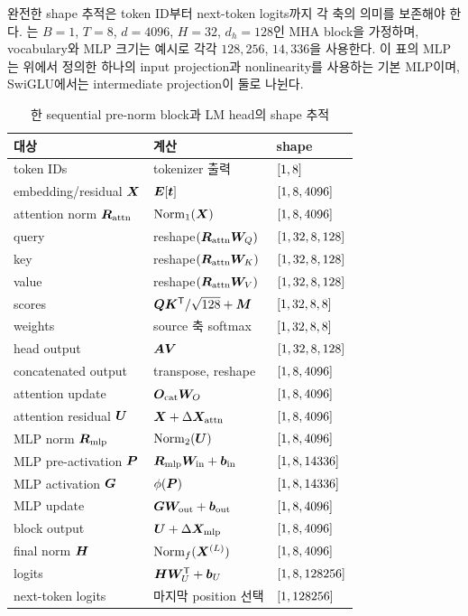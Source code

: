 완전한 shape 추적은 token ID부터 next-token logits까지 각 축의 의미를 보존해야 한다.
는 $B=1$, $T=8$, $d=4096$, $H=32$, $d_h=128$인 MHA block을 가정하며, vocabulary와 MLP 크기는 예시로 각각 $128{,}256$, $14{,}336$을 사용한다.
이 표의 MLP는 위에서 정의한 하나의 input projection과 nonlinearity를 사용하는 기본 MLP이며, SwiGLU에서는 intermediate projection이 둘로 나뉜다.

\begin{table}[htbp]
\centering
\small
\caption{한 sequential pre-norm block과 LM head의 shape 추적}
\label{tab:shape-trace}
\begin{tabularx}{\textwidth}{@{}YYl@{}}
\toprule
대상 & 계산 & shape \\
\midrule
token IDs & tokenizer 출력 & $\left[1,8\right]$ \\
embedding/residual $\bm{X}$ & $\bm{E}[\bm{t}]$ & $\left[1,8,4096\right]$ \\
attention norm $\bm{R}_{\mathrm{attn}}$ & $\operatorname{Norm}_{1}(\bm{X})$ & $\left[1,8,4096\right]$ \\
query & reshape$(\bm{R}_{\mathrm{attn}}\bm{W}_Q)$ & $\left[1,32,8,128\right]$ \\
key & reshape$(\bm{R}_{\mathrm{attn}}\bm{W}_K)$ & $\left[1,32,8,128\right]$ \\
value & reshape$(\bm{R}_{\mathrm{attn}}\bm{W}_V)$ & $\left[1,32,8,128\right]$ \\
scores & $\bm{Q}\bm{K}^{\mathsf T}/\sqrt{128}+\bm{M}$ & $\left[1,32,8,8\right]$ \\
weights & source 축 softmax & $\left[1,32,8,8\right]$ \\
head output & $\bm{A}\bm{V}$ & $\left[1,32,8,128\right]$ \\
concatenated output & transpose, reshape & $\left[1,8,4096\right]$ \\
attention update & $\bm{O}_{\mathrm{cat}}\bm{W}_O$ & $\left[1,8,4096\right]$ \\
attention residual $\bm{U}$ & $\bm{X}+\Delta\bm{X}_{\mathrm{attn}}$ & $\left[1,8,4096\right]$ \\
MLP norm $\bm{R}_{\mathrm{mlp}}$ & $\operatorname{Norm}_{2}(\bm{U})$ & $\left[1,8,4096\right]$ \\
MLP pre-activation $\bm{P}$ & $\bm{R}_{\mathrm{mlp}}\bm{W}_{\mathrm{in}}+\bm{b}_{\mathrm{in}}$ & $\left[1,8,14336\right]$ \\
MLP activation $\bm{G}$ & $\phi(\bm{P})$ & $\left[1,8,14336\right]$ \\
MLP update & $\bm{G}\bm{W}_{\mathrm{out}}+\bm{b}_{\mathrm{out}}$ & $\left[1,8,4096\right]$ \\
block output & $\bm{U}+\Delta\bm{X}_{\mathrm{mlp}}$ & $\left[1,8,4096\right]$ \\
final norm $\bm{H}$ & $\operatorname{Norm}_{f}(\bm{X}^{(L)})$ & $\left[1,8,4096\right]$ \\
logits & $\bm{H}\bm{W}_{U}^{\mathsf T}+\bm{b}_{U}$ & $\left[1,8,128256\right]$ \\
next-token logits & 마지막 position 선택 & $\left[1,128256\right]$ \\
\bottomrule
\end{tabularx}
\end{table}

